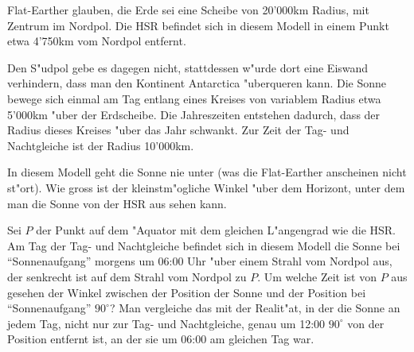Flat-Earther glauben, die Erde sei eine Scheibe von 20'000km Radius,
mit Zentrum im Nordpol.
Die HSR befindet sich in diesem Modell in einem Punkt etwa 4'750km
vom Nordpol entfernt.

Den S"udpol gebe es dagegen nicht, stattdessen w"urde dort eine Eiswand
verhindern, dass man den Kontinent Antarctica "uberqueren kann.
Die Sonne bewege sich einmal am Tag entlang eines Kreises von variablem
Radius etwa 5'000km "uber der Erdscheibe.
Die Jahreszeiten entstehen dadurch, dass der Radius dieses Kreises
"uber das Jahr schwankt.
Zur Zeit der Tag- und Nachtgleiche ist der Radius 10'000km.

\begin{teilaufgaben}
\item
In diesem Modell geht die Sonne nie unter (was die Flat-Earther anscheinen
nicht st"ort).
Wie gross ist der kleinstm"ogliche Winkel "uber dem Horizont, unter dem
man die Sonne von der HSR aus sehen kann.
\item
Sei $P$ der Punkt auf dem "Aquator mit dem gleichen L"angengrad wie
die HSR.
Am Tag der Tag- und Nachtgleiche befindet sich in diesem Modell
die Sonne bei ``Sonnenaufgang'' morgens um 06:00 Uhr "uber einem Strahl
vom Nordpol aus, der senkrecht ist auf dem Strahl vom Nordpol zu $P$.
Um welche Zeit ist von $P$ aus gesehen der Winkel zwischen der Position
der Sonne und der Position bei ``Sonnenaufgang'' $90^\circ$?
Man vergleiche das mit der Realit"at, in der die Sonne an jedem Tag,
nicht nur zur Tag- und Nachtgleiche, genau um 12:00 
$90^\circ$ von der Position entfernt ist, an der sie um 06:00 am
gleichen Tag war.
\end{teilaufgaben}


